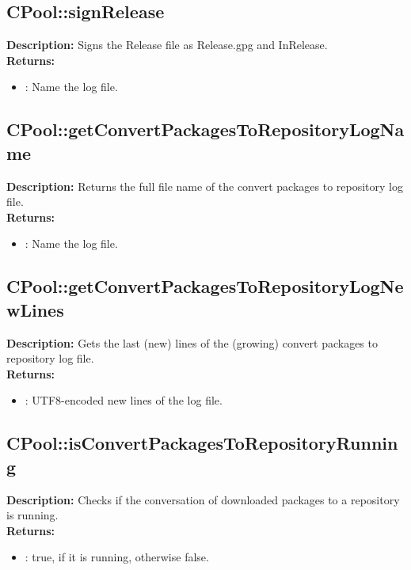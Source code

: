 \subsection{CPool::signRelease}
\textbf{Description:} Signs the Release file as Release.gpg and InRelease.\\
\textbf{Returns:}
\begin{itemize}
\item : Name the log file.
\end{itemize}

\subsection{CPool::getConvertPackagesToRepositoryLogName}
\textbf{Description:} Returns the full file name of the convert packages to repository log file.\\
\textbf{Returns:}
\begin{itemize}
\item : Name the log file.
\end{itemize}

\subsection{CPool::getConvertPackagesToRepositoryLogNewLines}
\textbf{Description:} Gets the last (new) lines of the (growing) convert packages to repository log file.\\
\textbf{Returns:}
\begin{itemize}
\item : UTF8-encoded new lines of the log file.
\end{itemize}

\subsection{CPool::isConvertPackagesToRepositoryRunning}
\textbf{Description:} Checks if the conversation of downloaded packages to a repository is running.\\
\textbf{Returns:}
\begin{itemize}
\item : true, if it is running, otherwise false.
\end{itemize}

